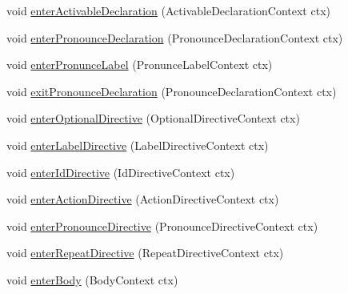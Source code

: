 \begin{DoxyCompactItemize}
\item 
void \hyperlink{classit_1_1emarolab_1_1cagg_1_1core_1_1language_1_1parser_1_1ParserListener_a6fe0fc5feb3e5ab16842072f4f2a8201}{enter\-Activable\-Declaration} (Activable\-Declaration\-Context ctx)
\item 
void \hyperlink{classit_1_1emarolab_1_1cagg_1_1core_1_1language_1_1parser_1_1ParserListener_a964aca142e5e1253c64798d9daff04b9}{enter\-Pronounce\-Declaration} (Pronounce\-Declaration\-Context ctx)
\item 
void \hyperlink{classit_1_1emarolab_1_1cagg_1_1core_1_1language_1_1parser_1_1ParserListener_a65d81e07d1c968308fc4a106137db828}{enter\-Pronunce\-Label} (Pronunce\-Label\-Context ctx)
\item 
void \hyperlink{classit_1_1emarolab_1_1cagg_1_1core_1_1language_1_1parser_1_1ParserListener_a277d97afa1957989d49938197b3b4b2d}{exit\-Pronounce\-Declaration} (Pronounce\-Declaration\-Context ctx)
\item 
void \hyperlink{classit_1_1emarolab_1_1cagg_1_1core_1_1language_1_1parser_1_1ParserListener_a77953040a7c457024508d8529003d882}{enter\-Optional\-Directive} (Optional\-Directive\-Context ctx)
\item 
void \hyperlink{classit_1_1emarolab_1_1cagg_1_1core_1_1language_1_1parser_1_1ParserListener_af28b67a9e6ae61f3a485c8a88b94c5ab}{enter\-Label\-Directive} (Label\-Directive\-Context ctx)
\item 
void \hyperlink{classit_1_1emarolab_1_1cagg_1_1core_1_1language_1_1parser_1_1ParserListener_a552055f5041c5444a6e44770ce5d0c31}{enter\-Id\-Directive} (Id\-Directive\-Context ctx)
\item 
void \hyperlink{classit_1_1emarolab_1_1cagg_1_1core_1_1language_1_1parser_1_1ParserListener_a9233a028613b18046af6c3f3b77a7dbd}{enter\-Action\-Directive} (Action\-Directive\-Context ctx)
\item 
void \hyperlink{classit_1_1emarolab_1_1cagg_1_1core_1_1language_1_1parser_1_1ParserListener_a406db0f03178494cbd8970993eb3b260}{enter\-Pronounce\-Directive} (Pronounce\-Directive\-Context ctx)
\item 
void \hyperlink{classit_1_1emarolab_1_1cagg_1_1core_1_1language_1_1parser_1_1ParserListener_a8da7de776603a44d18cc54fcdd8ff37c}{enter\-Repeat\-Directive} (Repeat\-Directive\-Context ctx)
\item 
void \hyperlink{classit_1_1emarolab_1_1cagg_1_1core_1_1language_1_1parser_1_1ParserListener_a9675dd98156b94a9e26cea3946eaa69d}{enter\-Body} (Body\-Context ctx)
\item 

\end{DoxyCompactItemize}
